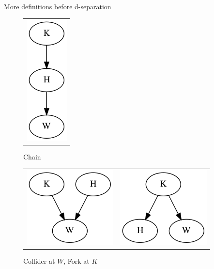 \begin{frame}{More definitions before d-separation}
  \begin{figure}[ht]
    \begin{tabular}{c}
      \includegraphics[height=0.35\textheight]{graphics/karma_chain}
    \end{tabular}
    \caption{Chain}
    \begin{tabular}{cc}
      \includegraphics[height=0.35\textheight]{graphics/karma_collider}
      &
      \includegraphics[height=0.35\textheight]{graphics/karma_fork}
    \end{tabular}
  \caption{Collider at $W$, Fork at $K$}
  \end{figure}
\end{frame}


